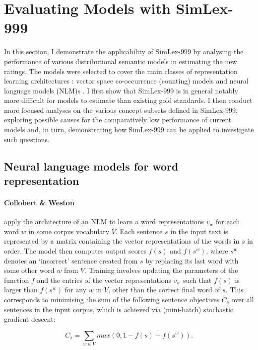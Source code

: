 \section{Evaluating Models with SimLex-999}
\label{evaluation}

In this section, I demonstrate the applicability of SimLex-999 by analysing the performance of various distributional semantic models in estimating the new ratings. The models were selected to cover the main classes of representation learning architectures \citep{baroni2014don}: vector space co-occurrence (counting) models and neural language models (NLM)s \citep{Bengio2003lm}. I first show that SimLex-999 is in general notably more difficult for models to estimate than existing gold standards. I then conduct more focused analyses on the various concept subsets defined in SimLex-999, exploring possible causes for the comparatively low performance of current models and, in turn, demonstrating how SimLex-999 can be applied to investigate such questions.    

\subsection{Neural language models for word representation}
\label{prev}

\paragraph{\bf Collobert \& Weston}

\cite{collobert2008unified} apply the architecture of an NLM to learn a word representations \(v_w\) for each word \(w\) in some corpus vocabulary \( V\). Each sentence \( s\) in the input text is represented by a matrix containing the vector representations of the words in \(s\) in order. The model then computes output scores \(f(s) \) and \(f(s^w) \), where \(s^w\) denotes an `incorrect' sentence created from \(s\) by replacing its last word with some other word \( w\) from \(V\). Training involves updating the parameters of the function \(f\) and the entries of the vector representations \(v_w\) such that  \(f(s)\) is larger than \(f(s^w) \) for any \(w\) in \(V\), other than the correct final word of \(s\). This corresponds to minimising the sum of the following sentence objectives \( C_s\) over all sentences in the input corpus, which is achieved via (mini-batch) stochastic gradient descent:

\[ C_{s}  = \sum_{w \in V} max(0,1-f(s) + f(s^w)). \]

